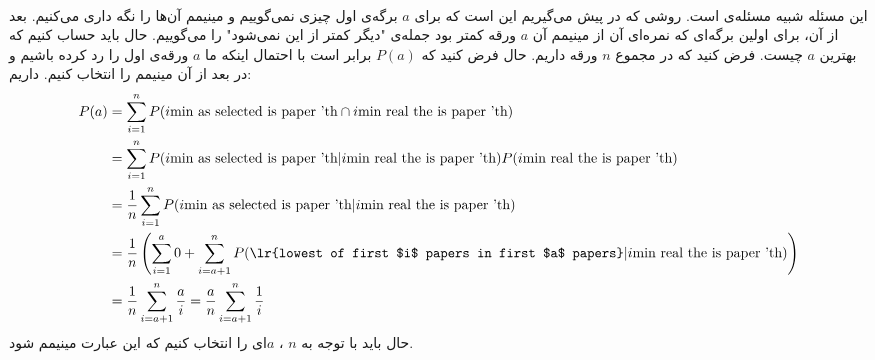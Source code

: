 \\
این مسئله شبیه مسئله‌ی
است. روشی که در پیش می‌گیریم این است که برای
$a$
برگه‌ی اول چیزی نمی‌گوییم و مینیمم آن‌ها را نگه داری می‌کنیم. بعد از آن، برای اولین برگه‌ای که نمره‌ای آن
از مینیمم آن
$a$
ورقه کمتر بود جمله‌ی
"دیگر کمتر از این نمی‌شود"
را می‌گوییم. حال باید حساب کنیم که بهترین
$a$
چیست. فرض کنید که در مجموع
$n$
ورقه داریم. حال فرض کنید که
$P(a)$
برابر است با احتمال اینکه ما
$a$
ورقه‌ی اول را رد کرده باشیم و در بعد از آن مینیمم را انتخاب کنیم. داریم:
\begin{align*}
    P(a) &= \sum_{i=1}^n P(i\text{min as selected is paper 'th} \cap i\text{min real the is paper 'th})\\
    &= \sum_{i=1}^n P(i\text{min as selected is paper 'th} | i\text{min real the is paper 'th}) P(i\text{min real the is paper 'th})\\
    &= \frac{1}{n} \sum_{i=1}^n P(i\text{min as selected is paper 'th} | i\text{min real the is paper 'th})\\
    &= \frac{1}{n} \left(\sum_{i=1}^{a} 0 + \sum_{i=a+1}^n P(\text{\lr{lowest of first $i$ papers in first $a$ papers}} | i\text{min real the is paper 'th})\right)\\
    &= \frac{1}{n} \sum_{i=a+1}^n \frac{a}{i} = \frac{a}{n} \sum_{i=a+1}^n \frac{1}{i}
\end{align*}
حال باید با توجه به
$n$
 ،
$a$ای را
انتخاب کنیم که این عبارت مینیمم شود.





